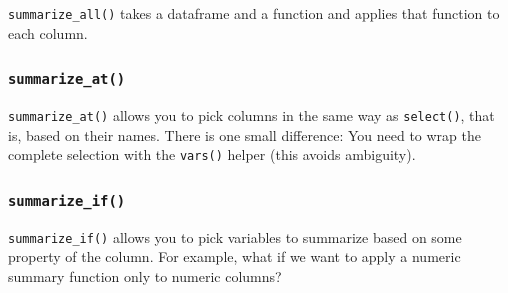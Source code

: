 \documentclass[]{book}
\newenvironment{Shaded}{\begin{snugshade}}{\end{snugshade}}
\newcommand{\KeywordTok}[1]{\textcolor[rgb]{0.13,0.29,0.53}{\textbf{#1}}}
\newcommand{\DataTypeTok}[1]{\textcolor[rgb]{0.13,0.29,0.53}{#1}}
\newcommand{\StringTok}[1]{\textcolor[rgb]{0.31,0.60,0.02}{#1}}
\newcommand{\CommentTok}[1]{\textcolor[rgb]{0.56,0.35,0.01}{\textit{#1}}}
\newcommand{\OperatorTok}[1]{\textcolor[rgb]{0.81,0.36,0.00}{\textbf{#1}}}
\newcommand{\NormalTok}[1]{#1}
\begin{document}
\texttt{summarize\_all()} takes a dataframe and a function and applies
that function to each column.

\begin{Shaded}
\end{Shaded}

\subsubsection*{\texorpdfstring{\texttt{summarize\_at()}}{summarize\_at()}}\label{summarize_at}

\texttt{summarize\_at()} allows you to pick columns in the same way as
\texttt{select()}, that is, based on their names. There is one small
difference: You need to wrap the complete selection with the
\texttt{vars()} helper (this avoids ambiguity).

\begin{Shaded}
\end{Shaded}

\subsubsection*{\texorpdfstring{\texttt{summarize\_if()}}{summarize\_if()}}\label{summarize_if}

\texttt{summarize\_if()} allows you to pick variables to summarize based
on some property of the column. For example, what if we want to apply a
numeric summary function only to numeric columns?

\begin{Shaded}
\end{Shaded}
\end{document}
